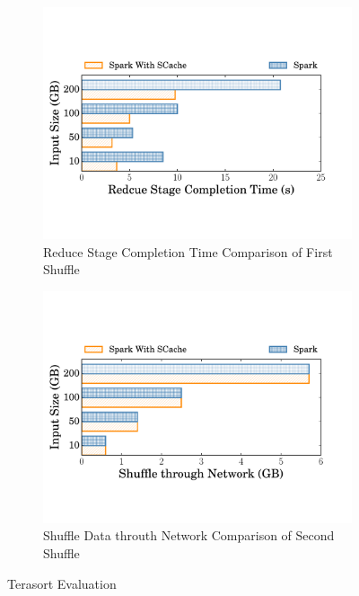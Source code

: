 \begin{figure}
	\begin{subfigure}{\linewidth}
		\centering
		\includegraphics[width=0.915\linewidth]{fig/tera}
		\caption{Reduce Stage Completion Time Comparison of First Shuffle}
		\label{fig:terasort}
	\end{subfigure}
	\vspace{0.08cm}
	\begin{subfigure}{\linewidth}
		\centering
		\includegraphics[width=0.915\linewidth]{fig/tera_shuffle}
		\caption{Shuffle Data throuth Network Comparison of Second Shuffle}
		\label{fig:terashuffle}
	\end{subfigure}
	\caption{Terasort Evaluation}
\end{figure}
